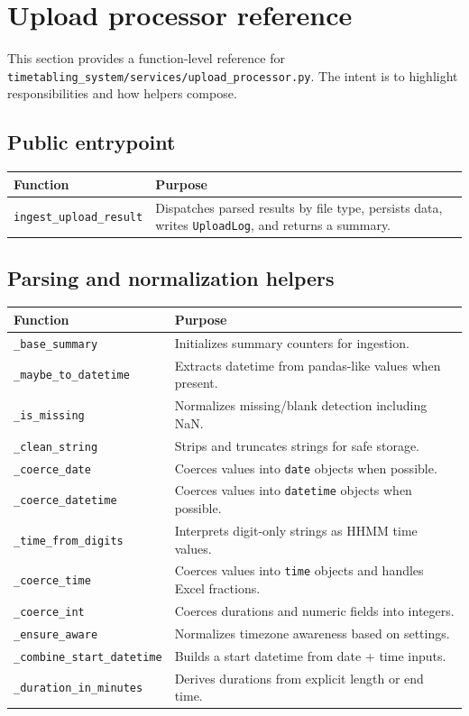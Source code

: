 \section{Upload processor reference}
\label{sec:uploadprocessor}

This section provides a function-level reference for \texttt{timetabling\_system/services/upload\_processor.py}. The intent is to highlight responsibilities and how helpers compose.

\subsection{Public entrypoint}
\label{subsec:uploadprocessor:entry}

\begin{longtable}{p{}p{}}
\toprule
\textbf{Function} & \textbf{Purpose} \\
\midrule
\texttt{ingest\_upload\_result} & Dispatches parsed results by file type, persists data, writes \texttt{UploadLog}, and returns a summary. \\
\bottomrule
\end{longtable}

\subsection{Parsing and normalization helpers}
\label{subsec:uploadprocessor:normalize}

\begin{longtable}{p{}p{}}
\toprule
\textbf{Function} & \textbf{Purpose} \\
\midrule
\texttt{\_base\_summary} & Initializes summary counters for ingestion. \\
\texttt{\_maybe\_to\_datetime} & Extracts datetime from pandas-like values when present. \\
\texttt{\_is\_missing} & Normalizes missing/blank detection including NaN. \\
\texttt{\_clean\_string} & Strips and truncates strings for safe storage. \\
\texttt{\_coerce\_date} & Coerces values into \texttt{date} objects when possible. \\
\texttt{\_coerce\_datetime} & Coerces values into \texttt{datetime} objects when possible. \\
\texttt{\_time\_from\_digits} & Interprets digit-only strings as HHMM time values. \\
\texttt{\_coerce\_time} & Coerces values into \texttt{time} objects and handles Excel fractions. \\
\texttt{\_coerce\_int} & Coerces durations and numeric fields into integers. \\
\texttt{\_ensure\_aware} & Normalizes timezone awareness based on settings. \\
\texttt{\_combine\_start\_datetime} & Builds a start datetime from date + time inputs. \\
\texttt{\_duration\_in\_minutes} & Derives durations from explicit length or end time. \\
\bottomrule
\end{longtable}

